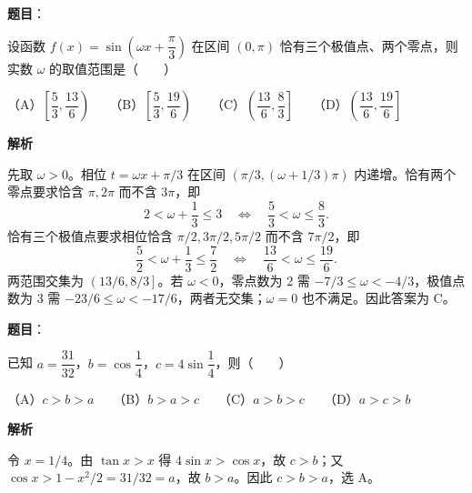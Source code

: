 \begin{answer}

\textbf{题目}：

设函数 $f(x)=\sin\left(\omega x+\dfrac\pi3\right)$ 在区间 $(0,\pi)$ 恰有三个极值点、两个零点，则实数 $\omega$ 的取值范围是\mbox{（　　）}

（A）$\left[\dfrac53,\dfrac{13}6\right)$　　（B）$\left[\dfrac53,\dfrac{19}6\right)$　　（C）$\left(\dfrac{13}6,\dfrac83\right]$　　（D）$\left(\dfrac{13}6,\dfrac{19}6\right]$

\textbf{解析}

先取 $\omega>0$。相位 $t=\omega x+\pi/3$ 在区间 $\left(\pi/3,(\omega+1/3)\pi\right)$ 内递增。恰有两个零点要求恰含 $\pi,2\pi$ 而不含 $3\pi$，即
\nopagebreak[4]
\[
2<\omega+\frac13\le3\quad\Longleftrightarrow\quad \frac53<\omega\le\frac83.
\]
恰有三个极值点要求相位恰含 $\pi/2,3\pi/2,5\pi/2$ 而不含 $7\pi/2$，即
\nopagebreak[4]
\[
\frac52<\omega+\frac13\le\frac72\quad\Longleftrightarrow\quad \frac{13}6<\omega\le\frac{19}6.
\]
两范围交集为 $\left(13/6,8/3\right]$。若 $\omega<0$，零点数为 2 需 $-7/3\le\omega<-4/3$，极值点数为 3 需 $-23/6\le\omega<-17/6$，两者无交集；$\omega=0$ 也不满足。因此答案为 C。

\gkanswer{答案：C（$\omega\in\left(\dfrac{13}6,\dfrac83\right]$）}

\end{answer}
\begin{answer}

\textbf{题目}：

已知 $a=\dfrac{31}{32}$，$b=\cos\dfrac14$，$c=4\sin\dfrac14$，则\mbox{（　　）}

（A）$c>b>a$　　（B）$b>a>c$　　（C）$a>b>c$　　（D）$a>c>b$

\textbf{解析}

令 $x=1/4$。由 $\tan x>x$ 得 $4\sin x>\cos x$，故 $c>b$；又 $\cos x>1-x^2/2=31/32=a$，故 $b>a$。因此 $c>b>a$，选 A。


\end{answer}

